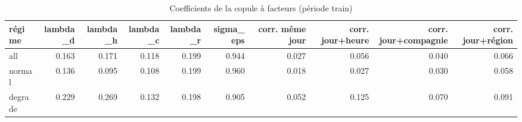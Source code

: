 \begin{table}
\caption{Coefficients de la copule à facteurs (période train)}
\label{tab:params}
\begin{tabular}{lrrrrrrrrr}
\toprule
régime & lambda\_d & lambda\_h & lambda\_c & lambda\_r & sigma\_eps & corr. même jour & corr. jour+heure & corr. jour+compagnie & corr. jour+région \\
\midrule
all & 0.163 & 0.171 & 0.118 & 0.199 & 0.944 & 0.027 & 0.056 & 0.040 & 0.066 \\
normal & 0.136 & 0.095 & 0.108 & 0.199 & 0.960 & 0.018 & 0.027 & 0.030 & 0.058 \\
degrade & 0.229 & 0.269 & 0.132 & 0.198 & 0.905 & 0.052 & 0.125 & 0.070 & 0.091 \\
\bottomrule
\end{tabular}
\end{table}
